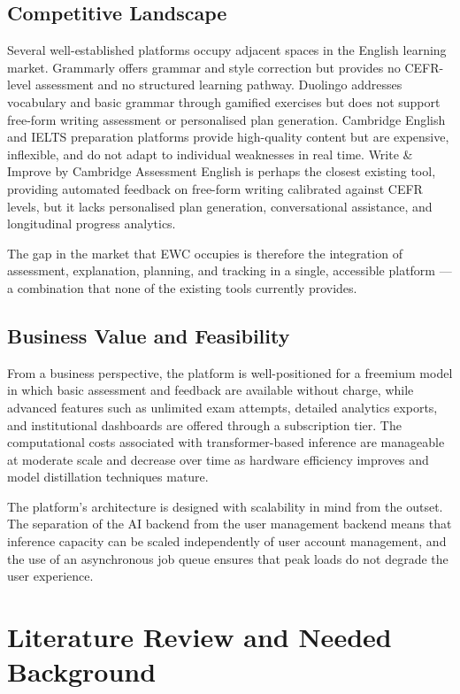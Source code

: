 \documentclass[12pt, a4paper]{report}
\begin{document}
\section{Competitive Landscape}

Several well-established platforms occupy adjacent spaces in the English learning market. Grammarly offers grammar and style correction but provides no CEFR-level assessment and no structured learning pathway. Duolingo addresses vocabulary and basic grammar through gamified exercises but does not support free-form writing assessment or personalised plan generation. Cambridge English and IELTS preparation platforms provide high-quality content but are expensive, inflexible, and do not adapt to individual weaknesses in real time. Write \& Improve by Cambridge Assessment English is perhaps the closest existing tool, providing automated feedback on free-form writing calibrated against CEFR levels, but it lacks personalised plan generation, conversational assistance, and longitudinal progress analytics.

The gap in the market that EWC occupies is therefore the integration of assessment, explanation, planning, and tracking in a single, accessible platform — a combination that none of the existing tools currently provides.

\section{Business Value and Feasibility}

From a business perspective, the platform is well-positioned for a freemium model in which basic assessment and feedback are available without charge, while advanced features such as unlimited exam attempts, detailed analytics exports, and institutional dashboards are offered through a subscription tier. The computational costs associated with transformer-based inference are manageable at moderate scale and decrease over time as hardware efficiency improves and model distillation techniques mature.

The platform's architecture is designed with scalability in mind from the outset. The separation of the AI backend from the user management backend means that inference capacity can be scaled independently of user account management, and the use of an asynchronous job queue ensures that peak loads do not degrade the user experience.

\chapter{Literature Review and Needed Background}
\label{ch:literature}
\end{document}
